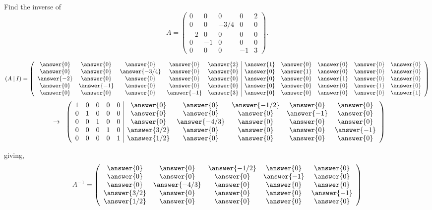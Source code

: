 \documentclass{ximera}
\author{Parisa Fatheddin}
\begin{document}
\begin{exercise}

Find the inverse of
\[A = \left(\begin{array}{ccccc}
0 & 0& 0& 0& 2\\
0 & 0& -3/4& 0& 0\\
-2 & 0& 0& 0& 0\\
0 & -1& 0& 0& 0\\
0 & 0& 0& -1& 3
\end{array}\right).
\]

\begin{prompt}
\[ (A \hspace{.08cm}| \hspace{.08cm} I)=
\left(\begin{array}{ccccc|ccccc}
\answer{0} & \answer{0} & \answer{0} & \answer{0} & \answer{2} & \answer{1} & \answer{0} & \answer{0} & \answer{0}& \answer{0}\\
\answer{0} & \answer{0} & \answer{-3/4} & \answer{0} & \answer{0} & \answer{0} & \answer{1} & \answer{0} & \answer{0} & \answer{0}\\
\answer{-2} & \answer{0} & \answer{0} & \answer{0} & \answer{0} & \answer{0} & \answer{0} & \answer{1} & \answer{0} & \answer{0}\\
\answer{0} & \answer{-1} & \answer{0} & \answer{0} & \answer{0}& \answer{0} & \answer{0} & \answer{0} & \answer{1} & \answer{0}\\
\answer{0} & \answer{0} & \answer{0} & \answer{-1} & \answer{3}& \answer{0} & \answer{0} & \answer{0} & \answer{0} & \answer{1}
\end{array}\right)
\]
\[
\hspace{.2cm} \rightarrow \hspace{.2cm}
\left(\begin{array}{ccccc|ccccc}
1 & 0& 0& 0& 0 & \answer{0} & \answer{0} & \answer{-1/2} & \answer{0} & \answer{0}\\
0 & 1& 0& 0& 0 & \answer{0} & \answer{0} & \answer{0} & \answer{-1} & \answer{0}\\
0 & 0& 1& 0& 0 & \answer{0} & \answer{-4/3} & \answer{0} & \answer{0} & \answer{0}\\
0 & 0& 0& 1& 0 & \answer{3/2} & \answer{0} & \answer{0} & \answer{0} & \answer{-1}\\
0 & 0& 0& 0& 1 & \answer{1/2} & \answer{0} & \answer{0} & \answer{0} & \answer{0}
\end{array}\right)
\]

giving,
\[
A^{-1} = \left(\begin{array}{ccccc}
\answer{0} & \answer{0} & \answer{-1/2} & \answer{0} & \answer{0}\\
 \answer{0} & \answer{0} & \answer{0} & \answer{-1} & \answer{0}\\
 \answer{0} & \answer{-4/3} & \answer{0} & \answer{0} & \answer{0}\\
 \answer{3/2} & \answer{0} & \answer{0} & \answer{0} & \answer{-1}\\
 \answer{1/2} & \answer{0} & \answer{0} & \answer{0} & \answer{0}
\end{array}\right)
\]

\end{prompt}
\end{exercise}
\end{document}
